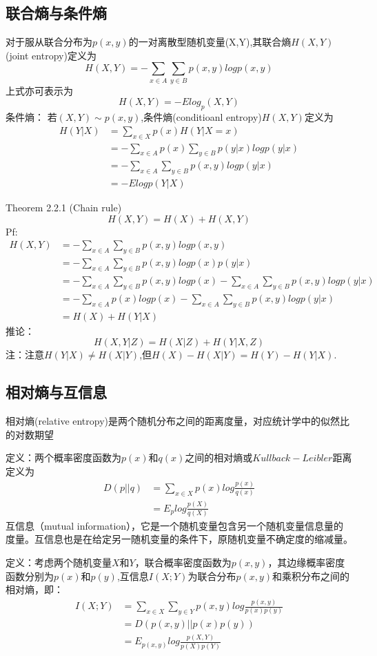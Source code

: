 \documentclass{article}
\begin{document}
\subsection{联合熵与条件熵}
对于服从联合分布为$p(x,y)$的一对离散型随机变量(X,Y),其联合熵$H(X,Y)$(joint entropy)定义为\[H(X,Y)=-\sum_{x \in A}\sum_{y \in B}p(x,y)logp(x,y)\]上式亦可表示为\[H(X,Y)=-Elog_p(X,Y)\]
条件熵：
若$(X,Y)\sim p(x,y)$,条件熵(conditioanl entropy)$H(X,Y)$定义为
\begin{align}
    H(Y|X)&=\sum_{x \in X}p(x)H(Y|X=x)\\
      &=-\sum_{x \in A}p(x)\sum_{y \in B}p(y|x)logp(y|x) \\
      &=-\sum_{x \in A}\sum_{y \in B}p(x,y)logp(y|x) \\
      &= -Elogp(Y|X)
\end{align}

Theorem 2.2.1 (Chain rule)\[H(X,Y)=H(X)+H(X,Y)\]
Pf:
\begin{align}
    H(X,Y)&=-\sum_{x \in A}\sum_{y \in B}p(x,y)logp(x,y)\\
          &=-\sum_{x \in A}\sum_{y \in B}p(x,y)logp(x)p(y|x)\\
          &=-\sum_{x \in A}\sum_{y \in B}p(x,y)logp(x)-\sum_{x \in A}\sum_{y\in B}p(x,y)logp(y|x)\\
          &=-\sum_{x\in A}p(x)logp(x)-\sum_{x\in A}\sum_{y\in B}p(x,y)logp(y|x)\\
          &=H(X)+H(Y|X)
\end{align}
推论：\[H(X,Y|Z)=H(X|Z)+H(Y|X,Z)\]
注：注意$H(Y|X)\neq H(X|Y)$,但$H(X)-H(X|Y)=H(Y)-H(Y|X)$.

\subsection{相对熵与互信息}

相对熵(relative entropy)是两个随机分布之间的距离度量，对应统计学中的似然比的对数期望

定义：两个概率密度函数为$p(x)$和$q(x)$之间的相对熵或$Kullback-Leibler$距离定义为
\begin{align}
    D(p||q)&=\sum_{x\in X}p(x)log\frac{p(x)}{q(x)}\\
           &=E_plog\frac{p(X)}{q(X)}
\end{align} 
互信息（mutual information），它是一个随机变量包含另一个随机变量信息量的度量。互信息也是在给定另一随机变量的条件下，原随机变量不确定度的缩减量。

定义：考虑两个随机变量$X$和$Y$，联合概率密度函数为$p(x,y)$，其边缘概率密度函数分别为$p(x)$和$p(y)$,互信息$I(X;Y)$为联合分布$p(x,y)$和乘积分布之间的相对熵，即：
\begin{align}
    I(X;Y)&=\sum_{x\in X}\sum_{y\in Y}p(x,y)log\frac{p(x,y)}{p(x)p(y)}\\
          &=D(p(x,y)||p(x)p(y))\\
          &=E_{p(x,y)}log\frac{p(X,Y)}{p(X)p(Y)}
\end{align}
\end{document}
